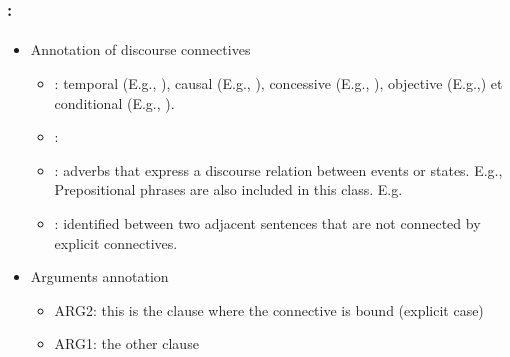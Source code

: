 \documentclass[xcolor=table]{beamer}
\begin{document}
\begin{frame}
	\frametitle{\insertshortsubtitle: \insertsection}
	\framesubtitle{\insertsubsection}
	
	\begin{itemize}
		\item Annotation of discourse connectives
		\begin{itemize}
			\item {}:  
			temporal (E.g., ), 
			causal (E.g., ), 
			concessive (E.g., ), 
			objective (E.g.,) et 
			conditional (E.g., ).
			
			\item {}: 
			
			\item {}: adverbs that express a discourse relation between events or states. E.g., 
			Prepositional phrases are also included in this class. E.g. 
			
			\item {}: identified between two adjacent sentences that are not connected by explicit connectives.
		\end{itemize}
		\item Arguments annotation
		\begin{itemize}
			\item ARG2: this is the clause where the connective is bound (explicit case)
			\item ARG1: the other clause
		\end{itemize}
	\end{itemize}
	
\end{frame}
\end{document}
